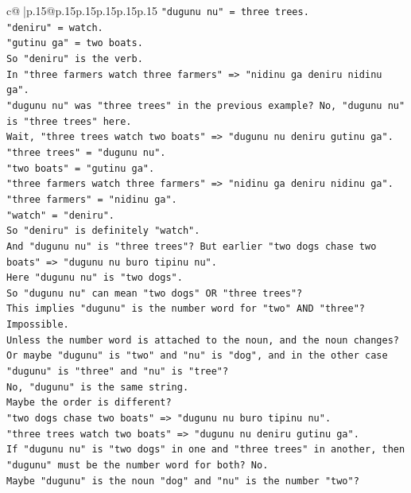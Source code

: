 \documentclass{article}
\begin{document}
{\begin{supertabular}{c@{$\;$}|p{.15\linewidth}@{}p{.15\linewidth}p{.15\linewidth}p{.15\linewidth}p{.15\linewidth}p{.15\linewidth}}
{{{\texttt{"dugunu nu" = three trees.} \\
\texttt{"deniru" = watch.} \\
\texttt{"gutinu ga" = two boats.} \\
\texttt{So "deniru" is the verb.} \\
\texttt{In "three farmers watch three farmers" => "nidinu ga deniru nidinu ga".} \\
\texttt{"dugunu nu" was "three trees" in the previous example? No, "dugunu nu" is "three trees" here.} \\
\texttt{Wait, "three trees watch two boats" => "dugunu nu deniru gutinu ga".} \\
\texttt{"three trees" = "dugunu nu".} \\
\texttt{"two boats" = "gutinu ga".} \\
\texttt{"three farmers watch three farmers" => "nidinu ga deniru nidinu ga".} \\
\texttt{"three farmers" = "nidinu ga".} \\
\texttt{"watch" = "deniru".} \\
\texttt{So "deniru" is definitely "watch".} \\
\texttt{And "dugunu nu" is "three trees"? But earlier "two dogs chase two boats" => "dugunu nu buro tipinu nu".} \\
\texttt{Here "dugunu nu" is "two dogs".} \\
\texttt{So "dugunu nu" can mean "two dogs" OR "three trees"?} \\
\texttt{This implies "dugunu" is the number word for "two" AND "three"? Impossible.} \\
\texttt{Unless the number word is attached to the noun, and the noun changes?} \\
\texttt{Or maybe "dugunu" is "two" and "nu" is "dog", and in the other case "dugunu" is "three" and "nu" is "tree"?} \\
\texttt{No, "dugunu" is the same string.} \\
\texttt{Maybe the order is different?} \\
\texttt{"two dogs chase two boats" => "dugunu nu buro tipinu nu".} \\
\texttt{"three trees watch two boats" => "dugunu nu deniru gutinu ga".} \\
\texttt{If "dugunu nu" is "two dogs" in one and "three trees" in another, then "dugunu" must be the number word for both? No.} \\
\texttt{Maybe "dugunu" is the noun "dog" and "nu" is the number "two"?} \\
}}}
\end{supertabular}}
\end{document}
